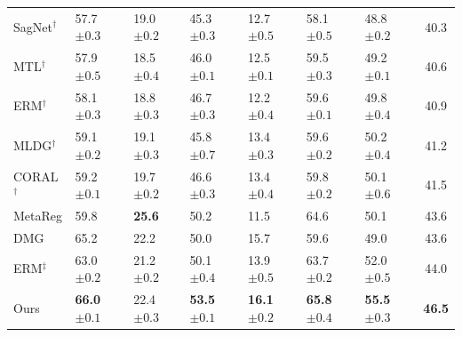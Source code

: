\begin{table}[H]
\begin{tabular}{lllllll|c}
SagNet$^\dagger$ & 57.7 \scriptsize$\pm0.3$ & 19.0 \scriptsize$\pm0.2$ & 45.3 \scriptsize$\pm0.3$ & 12.7 \scriptsize$\pm0.5$ & 58.1 \scriptsize$\pm0.5$ & 48.8 \scriptsize$\pm0.2$ & 40.3 \\
MTL$^\dagger$ & 57.9 \scriptsize$\pm0.5$ & 18.5 \scriptsize$\pm0.4$ & 46.0 \scriptsize$\pm0.1$ & 12.5 \scriptsize$\pm0.1$ & 59.5 \scriptsize$\pm0.3$ & 49.2 \scriptsize$\pm0.1$ & 40.6 \\
ERM$^\dagger$ & 58.1 \scriptsize$\pm0.3$ & 18.8 \scriptsize$\pm0.3$ & 46.7 \scriptsize$\pm0.3$ & 12.2 \scriptsize$\pm0.4$ & 59.6 \scriptsize$\pm0.1$ & 49.8 \scriptsize$\pm0.4$ & 40.9 \\
MLDG$^\dagger$ & 59.1 \scriptsize$\pm0.2$ & 19.1 \scriptsize$\pm0.3$ & 45.8 \scriptsize$\pm0.7$ & 13.4 \scriptsize$\pm0.3$ & 59.6 \scriptsize$\pm0.2$ & 50.2 \scriptsize$\pm0.4$ & 41.2 \\
CORAL$^\dagger$ & 59.2 \scriptsize$\pm0.1$ & 19.7 \scriptsize$\pm0.2$ & 46.6 \scriptsize$\pm0.3$ & 13.4 \scriptsize$\pm0.4$ & 59.8 \scriptsize$\pm0.2$ & 50.1 \scriptsize$\pm0.6$ & 41.5 \\
MetaReg & 59.8 & \textbf{25.6} & 50.2 & 11.5 & 64.6 & 50.1 & 43.6 \\
DMG & 65.2 & 22.2 & 50.0 & 15.7 & 59.6 & 49.0 & 43.6 \\
ERM$^\ddagger$ & 63.0 \scriptsize$\pm0.2$ & 21.2 \scriptsize$\pm0.2$ & 50.1 \scriptsize$\pm0.4$ & 13.9 \scriptsize$\pm0.5$ & 63.7 \scriptsize$\pm0.2$ & 52.0 \scriptsize$\pm0.5$ & 44.0 \\
\midrule
Ours & \textbf{66.0} \scriptsize$\pm0.1$ & 22.4 \scriptsize$\pm0.3$ & \textbf{53.5} \scriptsize$\pm0.1$ & \textbf{16.1} \scriptsize$\pm0.2$ & \textbf{65.8} \scriptsize$\pm0.4$ & \textbf{55.5} \scriptsize$\pm0.3$ & \textbf{46.5} \\
\bottomrule
\end{tabular}
\end{table}